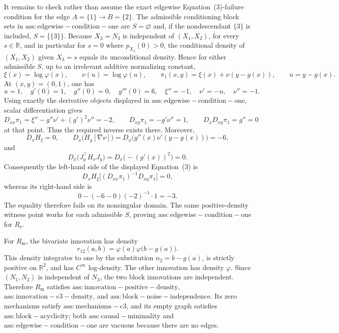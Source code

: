 It remains to check rather than assume the exact edgewise Equation~(3)-failure condition for the edge \(A=\{1\}\to B=\{2\}\).  The admissible conditioning block sets in \(\mathrm{ass:edgewise-condition-one}\) are \(S=\varnothing\) and, if the nondescendant \(\{3\}\) is included, \(S=\{\{3\}\}\).  Because \(X_3=N_3\) is independent of \((X_1,X_2)\), for every \(s\in\mathbb R\), and in particular for \(s=0\) where \(p_{X_3}(0)>0\), the conditional density of \((X_1,X_2)\) given \(X_3=s\) equals its unconditional density.  Hence for either admissible \(S\), up to an irrelevant additive normalizing constant,
\[
 \xi(x)=\log\varphi(x),\qquad
 \nu(u)=\log\varphi(u),\qquad
 \pi_1(x,y)=\xi(x)+\nu(y-g(x)),
 \qquad u=y-g(x).
\]
At \((x,y)=(0,1)\), one has
\[
 u=1,\quad g'(0)=1,\quad g''(0)=0,\quad g'''(0)=6,
 \quad \xi''=-1,\quad \nu'=-u,\quad \nu''=-1.
\]
Using exactly the derivative objects displayed in \(\mathrm{ass:edgewise-condition-one}\), scalar differentiation gives
\[
 D_{xx}\pi_1
   =\xi''-g''\nu'+(g')^2\nu''=-2,
 \qquad
 D_{xy}\pi_1=-g'\nu''=1,
 \qquad
 D_xD_{xy}\pi_1=g''=0
\]
at that point.  Thus the required inverse exists there.  Moreover,
\[
 D_xH_\xi=0,
 \qquad
 D_x\bigl(H_g[\nabla\nu]\bigr)
   =D_x\bigl(g''(x)\nu'(y-g(x))\bigr)=-6,
\]
and
\[
 D_x\bigl(J_g^{\top}H_\nu J_g\bigr)
   =D_x\bigl(-(g'(x))^2\bigr)=0.
\]
Consequently the left-hand side of the displayed Equation~(3) is
\[
 D_xH_\xi\bigl[(D_{xx}\pi_1)^{-1}D_{xy}\pi_1\bigr]=0,
\]
whereas its right-hand side is
\[
 0-(-6-0)(-2)^{-1}\cdot 1=-3.
\]
The equality therefore fails on its nonsingular domain.  The same positive-density witness point works for each admissible \(S\), proving \(\mathrm{ass:edgewise-condition-one}\) for \(R_{\mathrm{s}}\).

For \(R_{\mathrm{m}}\), the bivariate innovation has density
\[
 r_{12}(a,b)=\varphi(a)\varphi\bigl(b-g(a)\bigr).
\]
This density integrates to one by the substitution \(n_2=b-g(a)\), is strictly positive on \(\mathbb R^2\), and has \(C^\infty\) log-density.  The other innovation has density \(\varphi\).  Since \((N_1,N_2)\) is independent of \(N_3\), the two block innovations are independent.  Therefore \(R_{\mathrm{m}}\) satisfies \(\mathrm{ass:innovation-positive-density}\), \(\mathrm{ass:innovation-c3-density}\), and \(\mathrm{ass:block-noise-independence}\).  Its zero mechanisms satisfy \(\mathrm{ass:mechanisms-c3}\), and its empty graph satisfies \(\mathrm{ass:block-acyclicity}\); both \(\mathrm{ass:causal-minimality}\) and \(\mathrm{ass:edgewise-condition-one}\) are vacuous because there are no edges.

